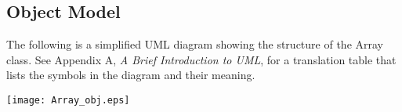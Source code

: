
\pagebreak
\subsection{Object Model}

The following is a simplified UML diagram showing the structure of the
Array class.  See Appendix A, {\it A Brief Introduction to UML},
for a translation table that lists the symbols in the diagram and their 
meaning.

\begin{center}
\texttt{[image: Array\_obj.eps]}   
\end{center}
